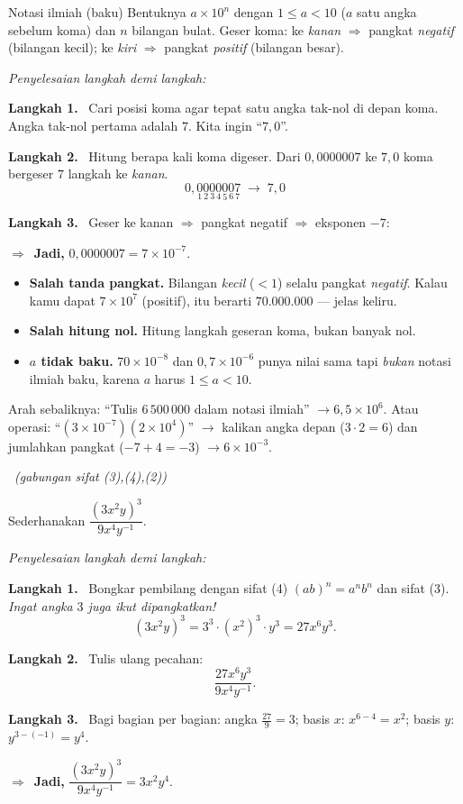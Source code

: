 \documentclass[11pt,a4paper]{report}
\theoremstyle{gaya}
\newcommand{\jawab}{\par\smallskip\noindent\textit{\textcolor{oranye}{Penyelesaian langkah demi langkah:}}\par\smallskip}
\newcommand{\langkah}[1]{\par\smallskip\noindent\textbf{\textcolor{biru}{Langkah #1.}}\ }
\newcommand{\jadi}{\par\smallskip\noindent$\Rightarrow$\ \textbf{Jadi, }}
\newcommand{\soalno}[2]{%
  \par\bigskip
  \noindent{\large\bfseries\color{ungu}\rule[-2pt]{4pt}{14pt}\ Soal #1}%
  \ {\normalfont\itshape\color{gray}(#2)}\par\nopagebreak\smallskip}
\begin{document}
\begin{ingat}{Notasi ilmiah (baku)}
Bentuknya $a\times 10^{n}$ dengan $1\le a < 10$ ($a$ satu angka sebelum koma) dan
$n$ bilangan bulat. Geser koma: ke \emph{kanan} $\Rightarrow$ pangkat
\emph{negatif} (bilangan kecil); ke \emph{kiri} $\Rightarrow$ pangkat
\emph{positif} (bilangan besar).
\end{ingat}

\jawab
\langkah{1} Cari posisi koma agar tepat satu angka tak-nol di depan koma. Angka
tak-nol pertama adalah $7$. Kita ingin ``$7{,}0$''.
\langkah{2} Hitung berapa kali koma digeser. Dari $0{,}0000007$ ke $7{,}0$ koma
bergeser $7$ langkah ke \emph{kanan}.
\[
0{,}\underset{1}{0}\underset{2}{0}\underset{3}{0}\underset{4}{0}\underset{5}{0}\underset{6}{0}\underset{7}{7}
\;\longrightarrow\; 7{,}0
\]
\langkah{3} Geser ke kanan $\Rightarrow$ pangkat negatif $\Rightarrow$ eksponen
$-7$:
\jadi $0{,}0000007 = 7\times 10^{-7}$.

\begin{jebakan}
\begin{itemize}[leftmargin=*,topsep=2pt]
  \item \textbf{Salah tanda pangkat.} Bilangan \emph{kecil} ($<1$) selalu pangkat
  \emph{negatif}. Kalau kamu dapat $7\times10^{7}$ (positif), itu berarti
  $70.000.000$ --- jelas keliru.
  \item \textbf{Salah hitung nol.} Hitung langkah geseran koma, bukan banyak nol.
  \item \textbf{$a$ tidak baku.} $70\times10^{-8}$ dan $0{,}7\times10^{-6}$ punya
  nilai sama tapi \emph{bukan} notasi ilmiah baku, karena $a$ harus $1\le a<10$.
\end{itemize}
\end{jebakan}

\begin{variasi}
Arah sebaliknya: ``Tulis $6\,500\,000$ dalam notasi ilmiah'' $\to 6{,}5\times10^6$.
Atau operasi: ``$(3\times10^{-7})(2\times10^{4})$'' $\to$ kalikan angka depan
($3\cdot2=6$) dan jumlahkan pangkat ($-7+4=-3$) $\to 6\times10^{-3}$.
\end{variasi}

\soalno{1.1.4}{gabungan sifat (3),(4),(2)}
\begin{soalbox}{}
Sederhanakan $\dfrac{(3x^2 y)^3}{9x^4 y^{-1}}$.
\end{soalbox}

\jawab
\langkah{1} Bongkar pembilang dengan sifat (4) $(ab)^n=a^n b^n$ dan sifat (3).
\emph{Ingat angka $3$ juga ikut dipangkatkan!}
\[
(3x^2 y)^3 = 3^3 \cdot (x^2)^3 \cdot y^3 = 27 x^{6} y^{3}.
\]
\langkah{2} Tulis ulang pecahan:
\[
\frac{27 x^6 y^3}{9 x^4 y^{-1}}.
\]
\langkah{3} Bagi bagian per bagian: angka $\frac{27}{9}=3$; basis $x$:
$x^{6-4}=x^2$; basis $y$: $y^{3-(-1)}=y^{4}$.
\jadi $\dfrac{(3x^2y)^3}{9x^4y^{-1}} = 3x^2 y^4$.
\end{document}
